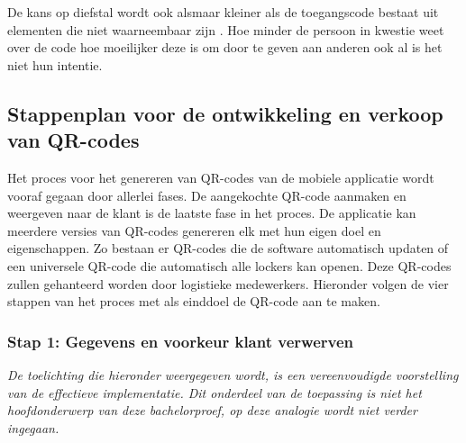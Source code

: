 De kans op diefstal wordt ook alsmaar kleiner als de toegangscode bestaat uit elementen die niet waarneembaar zijn \autocite{Baharav2013}. Hoe minder de persoon in kwestie weet over de code hoe moeilijker deze is om door te geven aan anderen ook al is het niet hun intentie.

\newpage
\subsection{Stappenplan voor de ontwikkeling en verkoop van QR-codes}%
\label{sec:opbouwQR-codeVerkoop}

Het proces voor het genereren van QR-codes van de mobiele applicatie wordt vooraf gegaan door allerlei fases. De aangekochte QR-code aanmaken en weergeven naar de klant is de laatste fase in het proces. De applicatie kan meerdere versies van QR-codes genereren elk met hun eigen doel en eigenschappen. Zo bestaan er QR-codes die de software automatisch updaten of een universele QR-code die automatisch alle lockers kan openen. Deze QR-codes zullen gehanteerd worden door logistieke medewerkers. Hieronder volgen de vier stappen van het proces met als einddoel de QR-code aan te maken.

\begin{comment}
    Hoewel een QR-code een standaard grafische voorstelling is, kan de grootte van een code verschillen. Wanneer een code groter is, ontstaat er meer witruimte tussen de pixels \autocite{Li2018}. Hierdoor kan de camera de code makkelijker en sneller scannen \autocite{Karrach2020}. Ook de foutcorrectie zorgt ervoor dat de resolutie vergroot zal worden. Hoe groter de resolutie van de QR-code hoe meer data gestockeerd kan worden \autocite{Chow2016}. 
\end{comment}


\subsubsection{Stap 1: Gegevens en voorkeur klant verwerven}%
\label{sec:opbouwQR-codeVerkoop1}

\textit {De toelichting die hieronder weergegeven wordt, is een vereenvoudigde voorstelling van de effectieve implementatie. Dit onderdeel van de toepassing is niet het hoofdonderwerp van deze bachelorproef, op deze analogie wordt niet verder ingegaan.}

